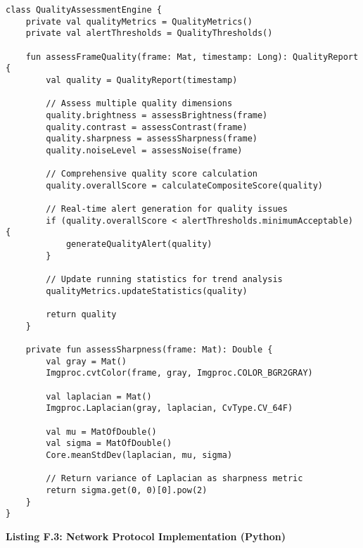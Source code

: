 \documentclass[11pt,a4paper]{report}
\begin{document}
\begin{verbatim}
class QualityAssessmentEngine {
    private val qualityMetrics = QualityMetrics()
    private val alertThresholds = QualityThresholds()

    fun assessFrameQuality(frame: Mat, timestamp: Long): QualityReport {
        val quality = QualityReport(timestamp)

        // Assess multiple quality dimensions
        quality.brightness = assessBrightness(frame)
        quality.contrast = assessContrast(frame)
        quality.sharpness = assessSharpness(frame)
        quality.noiseLevel = assessNoise(frame)

        // Comprehensive quality score calculation
        quality.overallScore = calculateCompositeScore(quality)

        // Real-time alert generation for quality issues
        if (quality.overallScore < alertThresholds.minimumAcceptable) {
            generateQualityAlert(quality)
        }

        // Update running statistics for trend analysis
        qualityMetrics.updateStatistics(quality)

        return quality
    }

    private fun assessSharpness(frame: Mat): Double {
        val gray = Mat()
        Imgproc.cvtColor(frame, gray, Imgproc.COLOR_BGR2GRAY)

        val laplacian = Mat()
        Imgproc.Laplacian(gray, laplacian, CvType.CV_64F)

        val mu = MatOfDouble()
        val sigma = MatOfDouble()
        Core.meanStdDev(laplacian, mu, sigma)

        // Return variance of Laplacian as sharpness metric
        return sigma.get(0, 0)[0].pow(2)
    }
}
\end{verbatim}

\textbf{Listing F.3: Network Protocol Implementation (Python)}
\end{document}
